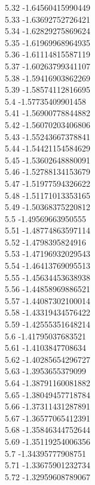 {5.32	-1.64560415990449\\
5.33	-1.63692752726421\\
5.34	-1.62829275869624\\
5.35	-1.61969968964935\\
5.36	-1.61114815587119\\
5.37	-1.60263799341107\\
5.38	-1.59416903862269\\
5.39	-1.58574112816695\\
5.4	-1.57735409901458\\
5.41	-1.56900778844882\\
5.42	-1.56070203406806\\
5.43	-1.55243667378841\\
5.44	-1.54421154584629\\
5.45	-1.53602648880091\\
5.46	-1.52788134153679\\
5.47	-1.51977594326622\\
5.48	-1.51171013353165\\
5.49	-1.50368375220812\\
5.5	-1.49569663950555\\
5.51	-1.48774863597114\\
5.52	-1.4798395824916\\
5.53	-1.47196932029543\\
5.54	-1.46413769095513\\
5.55	-1.45634453638938\\
5.56	-1.44858969886521\\
5.57	-1.44087302100014\\
5.58	-1.43319434576422\\
5.59	-1.42555351648214\\
5.6	-1.41795037683521\\
5.61	-1.4103847708634\\
5.62	-1.40285654296727\\
5.63	-1.3953655379099\\
5.64	-1.38791160081882\\
5.65	-1.38049457718784\\
5.66	-1.37311431287891\\
5.67	-1.36577065412391\\
5.68	-1.35846344752644\\
5.69	-1.35119254006356\\
5.7	-1.34395777908751\\
5.71	-1.33675901232734\\
5.72	-1.32959608789067\\
}
